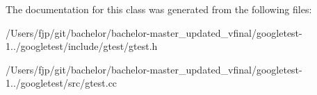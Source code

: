 The documentation for this class was generated from the following files\+:\begin{DoxyCompactItemize}
\item 
/\+Users/fjp/git/bachelor/bachelor-\/master\+\_\+updated\+\_\+vfinal/googletest-\/1../googletest/include/gtest/gtest.\+h\item 
/\+Users/fjp/git/bachelor/bachelor-\/master\+\_\+updated\+\_\+vfinal/googletest-\/1../googletest/src/gtest.\+cc\end{DoxyCompactItemize}
